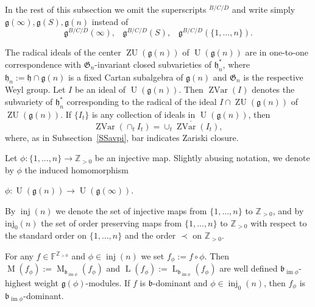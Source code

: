 \documentclass{emsprocart}
\begin{document}
In the rest of this subsection we omit the superscripts $^{B/C/D}$ and write simply $\mathfrak g(\infty), \mathfrak g(S), \mathfrak g(n)$ instead of $$\mathfrak g^{B/C/D}(\infty),\hspace{10pt} \mathfrak g^{B/C/D}(S),\hspace{10pt} \mathfrak g^{B/C/D}(\{1,..., n\}).$$

The radical ideals of the center
$\operatorname{ZU}(\mathfrak g(n))$ of $\operatorname{U}(\mathfrak g(n))$ are in one-to-one
correspondence with $\mathfrak G_n$-invariant closed subvarieties of $\mathfrak
h_n^*$, where $\mathfrak h_n:=\mathfrak h\cap \mathfrak g(n)$ is a fixed Cartan subalgebra of $\mathfrak g(n)$ and $\mathfrak G_n$ is the respective Weyl group. Let
$I$ be an ideal of $\operatorname{U}(\mathfrak g(n))$. Then $\operatorname{ZVar}(I)$ denotes the subvariety of $\mathfrak h_n^*$
corresponding to the radical of the ideal $I\cap\operatorname{ZU}(\mathfrak g(n))$ of $\operatorname{ZU}(\mathfrak g(n))$. If
$\{I_t\}$ is any collection of ideals in $\operatorname{U}(\mathfrak g(n))$, then
\begin{equation}\operatorname{ZVar}(\cap_tI_t)=\overline{\cup_t\operatorname{ZVar}(I_t)}\label{Ezv},\end{equation} where, as in Subsection~\ref{SSavpi}, bar indicates Zariski closure.

Let $\phi: \{1,..., n\}\to \mathbb Z_{>0}$ be an injective map.
Slightly abusing notation, we denote %
by $\phi$ the induced homomorphism\begin{center}$\phi:
\operatorname{U}(\mathfrak g(n))\to\operatorname{U}(\mathfrak g(\infty))$.\end{center}
By $\operatorname{inj}(n)$ we denote the set of injective maps from $\{1,..., n\}$ to $\mathbb Z_{>0}$, and by $\operatorname{inj_0}(n)$ the set of order preserving maps from $\{1,..., n\}$ to $\mathbb Z_{>0}$ with respect to the standard order on $\{1,..., n\}$ and the order $\prec$ on $\mathbb Z_{>0}$.

For any $f\in \mathbb F^{\mathbb Z_{>0}}$ and $\phi\in\operatorname{inj}(n)$ we set $f_\phi:=f\circ\phi$. Then $\operatorname{M}(f_\phi):=\operatorname{M}_{\mathfrak b_{\operatorname{im}\phi}}(f_\phi)$ and $\operatorname{L}(f_\phi):=\operatorname{L}_{\mathfrak b_{\operatorname{im}\phi}}(f_\phi)$ are well defined $\mathfrak b_{\operatorname{im}\phi}$-highest weight $\mathfrak g(\phi)$-modules. If $f$ is $\mathfrak b$-dominant and $\phi\in\operatorname{inj}_0(n)$, then $f_\phi$ is $\mathfrak b_{\operatorname{im}\phi}$-dominant. %
\end{document}
